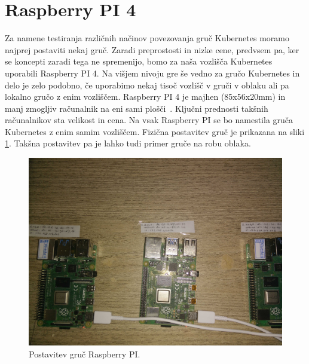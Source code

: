 \documentclass[a4paper, 12pt]{book}
\begin{document}
\section{Raspberry PI 4}
Za namene testiranja različnih načinov povezovanja gruč Kubernetes moramo najprej postaviti nekaj gruč.
Zaradi preprostosti in nizke cene, predvsem pa, ker se koncepti zaradi tega ne spremenijo, bomo za naša vozlišča Kubernetes uporabili Raspberry PI 4.
Na višjem nivoju gre še vedno za gručo Kubernetes in delo je zelo podobno, če uporabimo nekaj tisoč vozlišč v gruči v oblaku ali pa lokalno gručo z enim vozliščem.
Raspberry PI 4 je majhen (85x56x20mm) in manj zmogljiv računalnik na eni sami plošči~\cite{rpi-tech-spec}.
Ključni prednosti takšnih računalnikov sta velikost in cena.
Na vsak Raspberry PI se bo namestila gruča Kubernetes z enim samim vozliščem.
Fizična postavitev gruč je prikazana na sliki \ref{rpi-gruce}.
Takšna postavitev pa je lahko tudi primer gruče na robu oblaka.
\begin{figure}[h]
\begin{center}
\includegraphics[width=1.0\textwidth]{images/postavitev-raspberry.jpg}
\end{center}
\caption{Postavitev gruč Raspberry PI.}
\label{rpi-gruce}
\end{figure}
\end{document}

